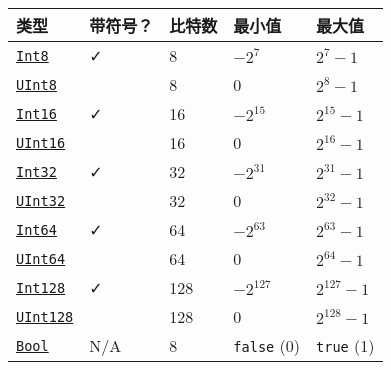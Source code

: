 
\begin{table}[h]
  \centering
\begin{tabulary}{\linewidth}{LLLLL}
  \toprule
  类型 & 带符号？ & 比特数 & 最小值 & 最大值 \\
  \midrule

  \hyperlink{5857518405103968275}{\texttt{Int8}} & ✓ & 8 & $ -2^{7} $ & $2^{7} - 1$ \\ \midrule
  \hyperlink{6609065134969660118}{\texttt{UInt8}} &  & 8 & 0 & $ 2^{8} - 1 $ \\ \midrule
  \hyperlink{6667287249103968645}{\texttt{Int16}} & ✓ & 16 & $ -2^{15} $ & $ 2^{15} - 1 $ \\ \midrule
  \hyperlink{7018610346698168012}{\texttt{UInt16}} &  & 16 & 0 & $ 2^{16} - 1 $ \\ \midrule
  \hyperlink{10103694114785108551}{\texttt{Int32}} & ✓ & 32 & $ -2^{31} $ & $ 2^{31} - 1 $ \\ \midrule
  \hyperlink{8690996847580776341}{\texttt{UInt32}} &  & 32 & 0 & $ 2^{32} - 1 $ \\ \midrule
  \hyperlink{7720564657383125058}{\texttt{Int64}} & ✓ & 64 & $ -2^{63} $ & $ 2^{63} - 1 $ \\ \midrule
  \hyperlink{5500998675195555601}{\texttt{UInt64}} &  & 64 & 0 & $ 2^{64} - 1 $ \\ \midrule
  \hyperlink{8012327724714767060}{\texttt{Int128}} & ✓ & 128 & $ -2^{127} $ & $ 2^{127} - 1 $ \\ \midrule
  \hyperlink{14811222188335428522}{\texttt{UInt128}} &  & 128 & 0 & $ 2^{128} - 1 $ \\ \midrule
  \hyperlink{46725311238864537}{\texttt{Bool}} & N/A & 8 & \texttt{false} (0) & \texttt{true} (1) \\
  \bottomrule
\end{tabulary}
\end{table}
